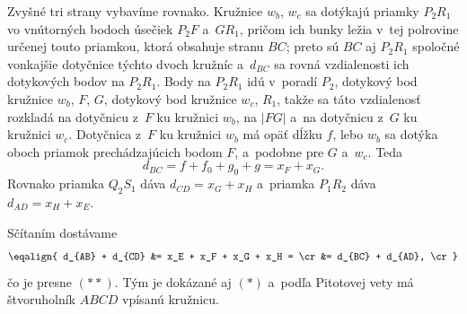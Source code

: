 {    Zvyšné tri strany vybavíme rovnako. Kružnice $w_b$, $w_c$ sa dotýkajú priamky $P_2R_1$ vo vnútorných bodoch úsečiek $P_2F$ a~$GR_1$, pričom ich bunky ležia v~tej polrovine určenej touto priamkou, ktorá obsahuje stranu $BC$; preto sú $BC$ aj $P_2R_1$ spoločné vonkajšie dotyčnice týchto dvoch kružníc a~$d_{BC}$ sa rovná vzdialenosti ich dotykových bodov na $P_2R_1$. Body na $P_2R_1$ idú v~poradí $P_2$, dotykový bod kružnice $w_b$, $F$, $G$, dotykový bod kružnice $w_c$, $R_1$, takže sa táto vzdialenosť rozkladá na dotyčnicu z~$F$ ku kružnici $w_b$, na $|FG|$ a~na dotyčnicu z~$G$ ku kružnici $w_c$. Dotyčnica z~$F$ ku kružnici $w_b$ má opäť dĺžku $f$, lebo $w_b$ sa dotýka oboch priamok prechádzajúcich bodom $F$, a~podobne pre $G$ a~$w_c$. Teda
    $$
    d_{BC} = f + f_0 + g_0 + g = x_F + x_G.
    $$
    Rovnako priamka $Q_2S_1$ dáva $d_{CD} = x_G + x_H$ a~priamka $P_1R_2$ dáva $d_{AD} = x_H + x_E$.

    Sčítaním dostávame
    $$
    \eqalign{
    d_{AB} + d_{CD} &= x_E + x_F + x_G + x_H = \cr
    &= d_{BC} + d_{AD}, \cr
    }
    $$
    čo je presne $(**)$. Tým je dokázané aj $(*)$ a~podľa Pitotovej vety má štvoruholník $ABCD$ vpísanú kružnicu.
}

